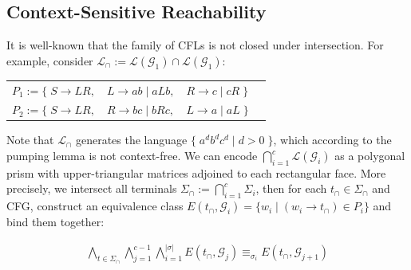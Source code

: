 \documentclass[sigplan,nonacm,anonymous]{acmart}\settopmatter{printfolios=false,printccs=false,printacmref=false}
\begin{document}
  \subsection{Context-Sensitive Reachability}

  It is well-known that the family of CFLs is not closed under intersection. For example, consider $\mathcal{L}_\cap := \mathcal{L}(\mathcal{G}_1) \cap \mathcal{L}(\mathcal{G}_1)$:

  \begin{table}[H]
  \begin{tabular}{llll}
    $P_1 := \big\{\;S \rightarrow L R,$ & $L \rightarrow a b \mid a L b,$ & $R \rightarrow c \mid c R\;\big\}$\vspace{5pt}\\
    $P_2 := \big\{\;S \rightarrow L R,$ & $R \rightarrow b c \mid b R c,$ & $L \rightarrow a \mid a L\;\big\}$
  \end{tabular}
  \end{table}

  \noindent Note that $\mathcal{L}_\cap$ generates the language $\big\{\;a^d b^d c^d \mid d > 0\;\big\}$, which according to the pumping lemma is not context-free. We can encode $\bigcap_{i=1}^c \mathcal{L}(\mathcal{G}_i)$ as a polygonal prism with upper-triangular matrices adjoined to each rectangular face. More precisely, we intersect all terminals $\Sigma_\cap := \bigcap_{i=1}^c \Sigma_i$, then for each $t_\cap \in \Sigma_\cap$ and CFG, construct an equivalence class $E(t_\cap, \mathcal{G}_i) = \{ w_i \mid (w_i \rightarrow t_\cap) \in P_i\}$ and bind them together:

 \begin{align}
  \bigwedge_{t\in\Sigma_\cap}\bigwedge_{j = 1}^{c-1}\bigwedge_{i=1}^{|\sigma|} E(t_{\cap}, \mathcal{G}_j) \equiv_{\sigma_i} E(t_{\cap}, \mathcal{G}_{j+1})
  \end{align}
\end{document}
